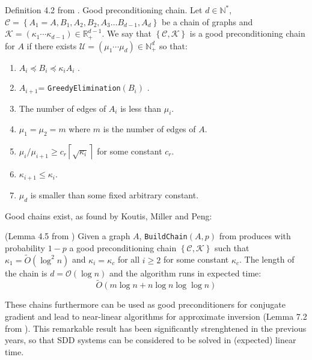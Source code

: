 \begin{definition} Definition 4.2 from \cite{Koutis2011}. Good preconditioning
chain. Let $d\in\mathbb{N}^{*}$, $\mathcal{C}=\left\{ A_{1}=A,B_{1},A_{2},B_{2},A_{3}\dots B_{d-1},A_{d}\right\} $
be a chain of graphs and $\mathcal{K}=\left(\kappa_{1}\cdots\kappa_{d-1}\right)\in\mathbb{R}_{+}^{d-1}$.
We say that $\left\{ \mathcal{C},\mathcal{K}\right\} $ is a good
preconditioning chain for $A$ if there exists $\mathcal{U}=\left(\mu_{1}\cdots\mu_{d}\right)\in\mathbb{N}_{+}^{d}$
so that:
\begin{enumerate}
\item $A_{i}\preceq B_{i}\preceq\kappa_{i}A_{i}$ .
\item $A_{i+1}$= \texttt{GreedyElimination}$\left(B_{i}\right)$ . %
\item The number of edges of $A_{i}$ is less than $\mu_{i}$.
\item $\mu_{1}=\mu_{2}=m$ where $m$ is the number of edges of $A$.
\item $\mu_{i}/\mu_{i+1}\geq c_{r}\left\lceil \sqrt{\kappa_{i}}\right\rceil $
for some constant $c_{r}$. 
\item $\kappa_{i+1}\leq\kappa_{i}$.
\item $\mu_{d}$ is smaller than some fixed arbitrary constant.
\end{enumerate}
\end{definition}

Good chains exist, as found by Koutis, Miller and Peng:

\begin{lemma} \label{lem:good-chain} (Lemma 4.5 from \cite{Koutis2011})
Given a graph $A$, \texttt{BuildChain}$\left(A,p\right)$ from \cite{Koutis2011}
produces with probability $1-p$ a good preconditioning chain $\left\{ \mathcal{C},\mathcal{K}\right\}$ such that $\kappa_1 = \tilde{O}\left(\log^{2}n\right)$ and $\kappa_i = \kappa_{c}$ for all $i \geq 2$ for some constant $\kappa_{c}$. The length of the chain is $d = \mathcal{O}\left(\log n\right)$ and the algorithm runs in expected time: 
\[
\tilde{O}\left(m\log n+n\log n\log\log n\right)
\]


\end{lemma}

These chains furthermore can be used as good preconditioners for conjugate
gradient and lead to near-linear algorithms for approximate inversion
(Lemma 7.2 from \cite{Koutis2010}). This remarkable result has been
significantly strenghtened in the previous years, so that SDD systems
can be considered to be solved in (expected) linear time.

